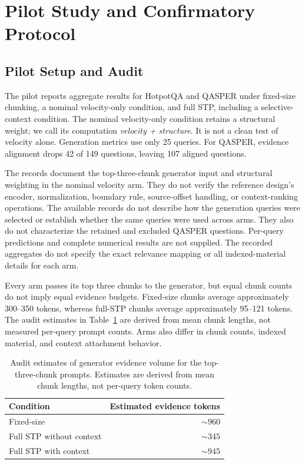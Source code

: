 \documentclass[10pt]{article}
\begin{document}
\section{Pilot Study and Confirmatory Protocol}

\subsection{Pilot Setup and Audit}

The pilot reports aggregate results for HotpotQA and QASPER under fixed-size chunking, a nominal velocity-only condition, and full STP, including a selective-context condition. The nominal velocity-only condition retains a structural weight; we call its computation \emph{velocity + structure}. It is not a clean test of velocity alone. Generation metrics use only 25 queries. For QASPER, evidence alignment drops 42 of 149 questions, leaving 107 aligned questions.

The records document the top-three-chunk generator input and structural weighting in the nominal velocity arm. They do not verify the reference design's encoder, normalization, boundary rule, source-offset handling, or context-ranking operations. The available records do not describe how the generation queries were selected or establish whether the same queries were used across arms. They also do not characterize the retained and excluded QASPER questions. Per-query predictions and complete numerical results are not supplied. The recorded aggregates do not specify the exact relevance mapping or all indexed-material details for each arm.

Every arm passes its top three chunks to the generator, but equal chunk counts do not imply equal evidence budgets. Fixed-size chunks average approximately 300--350 tokens, whereas full-STP chunks average approximately 95--121 tokens. The audit estimates in Table~\ref{tab:volume} are derived from mean chunk lengths, not measured per-query prompt counts. Arms also differ in chunk counts, indexed material, and context attachment behavior.

\begin{table}[t]
\centering
\begin{tabular}{lr}
\toprule
Condition & Estimated evidence tokens \\
\midrule
Fixed-size & $\sim 960$ \\
Full STP without context & $\sim 345$ \\
Full STP with context & $\sim 945$ \\
\bottomrule
\end{tabular}
\caption{Audit estimates of generator evidence volume for the top-three-chunk prompts. Estimates are derived from mean chunk lengths, not per-query token counts.}
\label{tab:volume}
\end{table}
\end{document}
